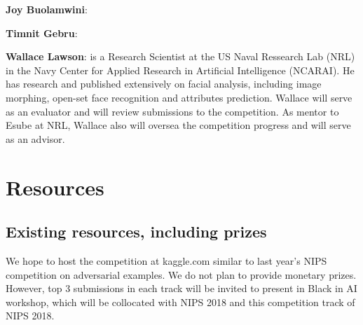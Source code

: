 \documentclass[11pt, oneside]{article}
\begin{document}
{\bf Joy Buolamwini}: 

{\bf Timnit Gebru}:

{\bf Wallace Lawson}: is a Research Scientist at the US Naval Ressearch Lab (NRL) in the Navy Center for Applied Research in Artificial Intelligence (NCARAI).  He has research and published extensively on facial analysis, including image morphing, open-set face recognition and attributes prediction.  Wallace will serve as an evaluator and will review submissions to the competition. As mentor to Esube at NRL, Wallace also will oversea the competition progress and will serve as an advisor.



\section{Resources}
\subsection{Existing resources, including prizes}

We hope to host the competition at kaggle.com similar to last year's NIPS competition on adversarial examples. We do not plan to provide monetary prizes. However, top 3 submissions in each track will be invited to present in Black in AI workshop, which will be collocated with NIPS 2018 and this competition track of NIPS 2018.



%

\end{document}
